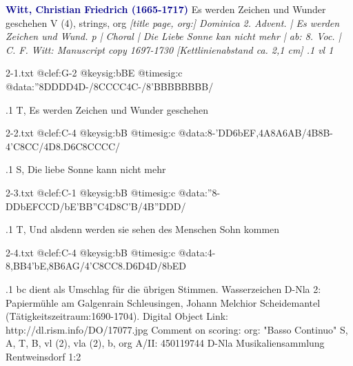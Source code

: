 \documentclass[twocolumn]{book}
\begin{document}
\newline \textcolor{darkblue}{\textbf{Witt, Christian Friedrich (1665-1717)
}}
\newline Es werden Zeichen und Wunder geschehen
\newline V (4), strings, org
\newline \itshape [title page, org:] Dominica 2. Advent. | Es werden Zeichen und Wund. p | Choral | Die Liebe Sonne kan nicht mehr | ab: 8. Voc. | C. F. Witt: \normalfont 
\newline \textcolor{darkblue}{} Manuscript copy 1697-1730 [Kettlinienabstand ca. 2,1 cm]
.1 vl 1
\newline
\begin{filecontents*}{2-1.txt}
@clef:G-2
@keysig:bBE
@timesig:c
@data:''8{DDDD}4D-/8{CCCC}4C-/8'{BBBB}{BBBB}/
\end{filecontents*}
\immediate{}
%
.1 T, Es werden Zeichen und Wunder geschehen
\newline
\begin{filecontents*}{2-2.txt}
@clef:C-4
@keysig:bB
@timesig:c
@data:8-'DD6{bEF},4A8A6{AB}/4B8B-4'C8CC/4D8.D6C8CCCC/
\end{filecontents*}
\immediate{}
%
.1 S, Die liebe Sonne kann nicht mehr
\newline
\begin{filecontents*}{2-3.txt}
@clef:C-1
@keysig:bB
@timesig:c
@data:''8-DDbE{FC}{CD}/{bE'B}{B''C}4D8{C'B}/4B''DDD/
\end{filecontents*}
\immediate{}
%
.1 T, Und alsdenn werden sie sehen des Menschen Sohn kommen
\newline
\begin{filecontents*}{2-4.txt}
@clef:C-4
@keysig:bB
@timesig:c
@data:4-8,BB4'bE,8B6AG/4'C8CC8.D6D4D/8bED
\end{filecontents*}
\immediate{}
%
.1
\newline bc dient als Umschlag für die übrigen Stimmen.
\newline Wasserzeichen D-Nla 2: Papiermühle am Galgenrain Schleusingen, Johann Melchior Scheidemantel (Tätigkeitszeitraum:1690-1704).
\newline Digital Object Link: http://dl.rism.info/DO/17077.jpg
\newline Comment on scoring: org: "Basso Continuo"
\newline S, A, T, B, vl (2), vla (2), b, org
\newline A/II: 450119744
\newline D-Nla Musikaliensammlung Rentweinsdorf 1:2
\newline 
\end{document}
